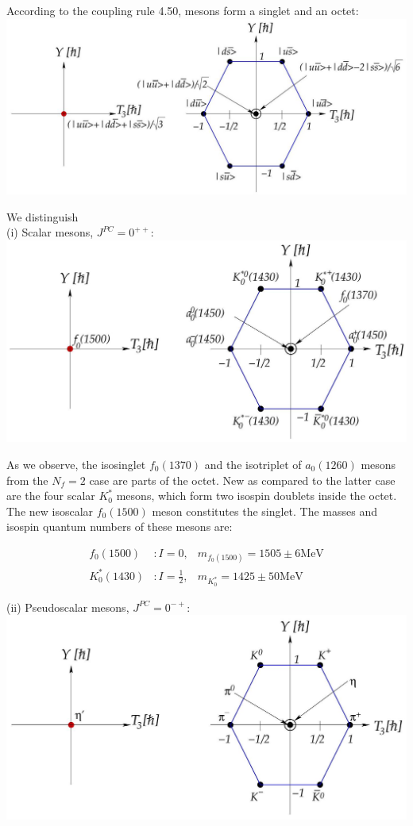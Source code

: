 \documentclass[10pt, letterpaper]{article}
\begin{document}
According to the coupling rule 4.50, mesons form a singlet and an octet:\\
\includegraphics[scale=0.3, center]{2025_05_20_8618f55a41bfe980b4b2g-68(1)}

We distinguish\\
(i) Scalar mesons, $J^{P C}=0^{++}$:\\
\includegraphics[scale=0.3, center]{2025_05_20_8618f55a41bfe980b4b2g-69}

As we observe, the isosinglet $f_{0}(1370)$ and the isotriplet of $a_{0}(1260)$ mesons from the $N_{f}=2$ case are parts of the octet. New as compared to the latter case are the four scalar $K_{0}^{*}$ mesons, which form two isospin doublets inside the octet. The new isoscalar $f_{0}(1500)$ meson constitutes the singlet. The masses and isospin quantum numbers of these mesons are:

$$
\begin{array}{rll}
f_{0}(1500) & : I=0, & m_{f_{0}(1500)}=1505 \pm 6 \mathrm{MeV} \\
K_{0}^{*}(1430) & : I=\frac{1}{2}, & m_{K_{0}^{*}}=1425 \pm 50 \mathrm{MeV}
\end{array}
$$

(ii) Pseudoscalar mesons, $J^{P C}=0^{-+}$:\\
\includegraphics[scale=0.3, center]{2025_05_20_8618f55a41bfe980b4b2g-69(1)}
\end{document}
